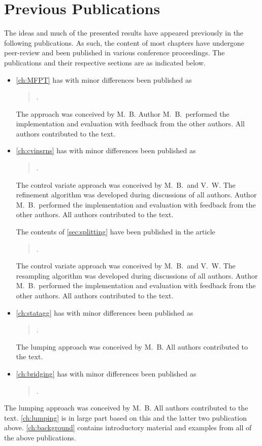 \section{Previous Publications}%
The ideas and much of the presented results have appeared previously in the following publications.
As such, the content of most chapters have undergone peer-review and been published in various conference proceedings.
The publications and their respective sections are as indicated below.

\begin{itemize}

\item \autoref{ch:MFPT} has with minor differences been published as
\begin{quote}
    .
\end{quote}
The approach was conceived by M.\ B.
Author M.\ B.\ performed the implementation and evaluation with feedback from the other authors.
All authors contributed to the text.

\item \autoref{ch:cvinsrns} has with minor differences been published as
\begin{quote}
    .
\end{quote}
The control variate approach was conceived by M.\ B.\ and V.\ W. The refinement algorithm was developed during discussions of all authors.
Author M.\ B.\ performed the implementation and evaluation with feedback from the other authors.
All authors contributed to the text.

The contents of \autoref{sec:splitting} have been published in the article
\begin{quote}
    .
\end{quote}
The control variate approach was conceived by M.\ B.\ and V.\ W. The resampling algorithm was developed during discussions of all authors.
Author M.\ B.\ performed the implementation and evaluation with feedback from the other authors.
All authors contributed to the text.

\item \autoref{ch:statagg} has with minor differences been published as
\begin{quote}
    .
\end{quote}
The lumping approach was conceived by M.\ B.
All authors contributed to the text.

\item \autoref{ch:bridging} has with minor differences been published as
\begin{quote}
    .
\end{quote}
\end{itemize}
The lumping approach was conceived by M.\ B.
All authors contributed to the text.
\autoref{ch:lumping} is in large part based on this and the latter two publication above.
\autoref{ch:background} contains introductory material and examples from all of the above publications.


